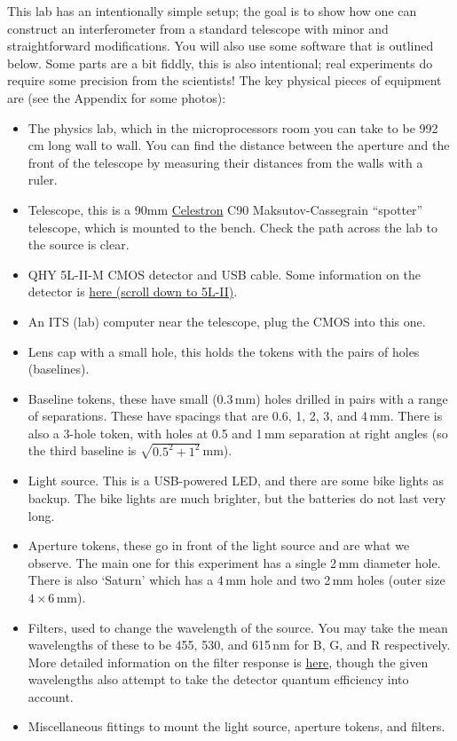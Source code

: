 \documentclass[11pt]{article}
\begin{document}
This lab has an intentionally simple setup; the goal is to show how one can construct an interferometer from a standard telescope with minor and straightforward modifications. You will also use some software that is outlined below. Some parts are a bit fiddly, this is also intentional; real experiments do require some precision from the scientists! The key physical pieces of equipment are (see the Appendix for some photos):
\begin{itemize}
    \item The physics lab, which in the microprocessors room you can take to be 992\,cm long wall to wall. You can find the distance between the aperture and the front of the telescope by measuring their distances from the walls with a ruler.
    \item Telescope, this is a 90mm \href{https://www.celestron.com/products/c90-mak-spotting-scope#description}{Celestron} C90 Maksutov-Cassegrain ``spotter'' telescope, which is mounted to the bench. Check the path across the lab to the source is clear.
    \item QHY 5L-II-M CMOS detector and USB cable. Some information on the detector is \href{https://www.qhyccd.com/discontinued-products/}{here (scroll down to 5L-II)}.
    \item An ITS (lab) computer near the telescope, plug the CMOS into this one.
    \item Lens cap with a small hole, this holds the tokens with the pairs of holes (baselines).
    \item Baseline tokens, these have small (0.3\,mm) holes drilled in pairs with a range of separations. These have spacings that are 0.6, 1, 2, 3, and 4\,mm. There is also a 3-hole token, with holes at 0.5 and 1\,mm separation at right angles (so the third baseline is $\sqrt{0.5^2 + 1^2}$\,mm).
    \item Light source. This is a USB-powered LED, and there are some bike lights as backup. The bike lights are much brighter, but the batteries do not last very long.
    \item Aperture tokens, these go in front of the light source and are what we observe. The main one for this experiment has a single 2\,mm diameter hole. There is also `Saturn' which has a 4\,mm hole and two 2\,mm holes (outer size $4 \times 6$\,mm).
    \item Filters, used to change the wavelength of the source. You may take the mean wavelengths of these to be 455, 530, and 615\,nm for B, G, and R respectively. More detailed information on the filter response is \href{https://www.firstlightoptics.com/rgb-filters-filter-sets/zwo-2-lrgb-filter-set.html}{here}, though the given wavelengths also attempt to take the detector quantum efficiency into account.
    \item Miscellaneous fittings to mount the light source, aperture tokens, and filters.
\end{itemize}
\end{document}

